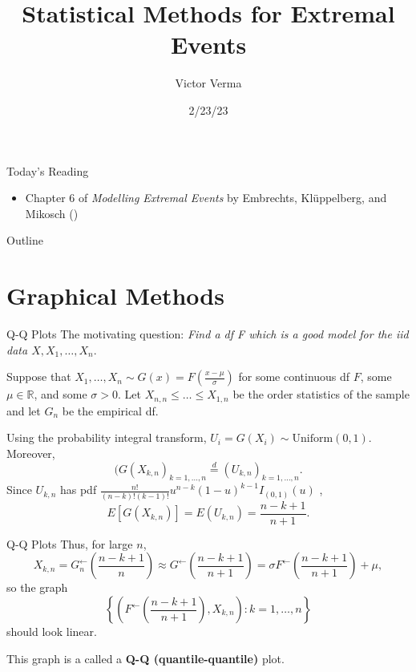 \documentclass{beamer}
\title[Statistical Methods for Extremal Events]{Statistical Methods for Extremal Events}
\author{Victor Verma}
\institute[]
{
Prof. Yang Chen's Reading Group \\
Department of Statistics \\
University of Michigan
}
\date[2/23/23]{2/23/23}
\begin{document}
\begin{frame}
    \titlepage
\end{frame}

\begin{frame}{Today's Reading}
    \begin{itemize}
        \item Chapter 6 of \textit{Modelling Extremal Events} by Embrechts, Kl\"{u}ppelberg, and Mikosch (\cite{embrechts_et_al_1997})
    \end{itemize}
\end{frame}

\begin{frame}{Outline}
    \tableofcontents
\end{frame}

\section{Graphical Methods}

\begin{frame}{Q-Q Plots}
    The motivating question: \textit{Find a df F which is a good model for the iid data $X, X_1, \ldots, X_n$}.

    \medskip

    Suppose that $X_1, \ldots, X_n \sim G(x) = F\left(\frac{x - \mu}{\sigma}\right)$ for some continuous df $F$, some $\mu \in \mathbb{R}$, and some $\sigma > 0$. Let $X_{n, n} \le \ldots \le X_{1, n}$ be the order statistics of the sample and let $G_n$ be the empirical df.

    \medskip

    Using the probability integral transform, $U_i = G(X_i) \sim \text{Uniform}(0, 1)$. Moreover,
    \[
    (G(X_{k, n})_{k = 1, \ldots, n} \overset{d}{=} (U_{k, n})_{k = 1, \ldots, n}.
    \]
    Since $U_{k, n}$ has pdf $\frac{n!}{(n - k)!(k - 1)!}u^{n - k}(1 - u)^{k - 1}I_{(0, 1)}(u)$ \cite{casella_and_berger_2002},
    \[
    E[G(X_{k, n})] = E(U_{k, n}) = \frac{n - k + 1}{n + 1}.
    \]
\end{frame}

\begin{frame}{Q-Q Plots}
    Thus, for large $n$,
    \[
    X_{k, n} = G_n^{\leftarrow}\left(\frac{n - k + 1}{n}\right) \approx G^{\leftarrow}\left(\frac{n - k + 1}{n + 1}\right) = \sigma F^{\leftarrow}\left(\frac{n - k + 1}{n + 1}\right) + \mu,
    \]
    so the graph
    \[
    \left\{\left(F^{\leftarrow}\left(\frac{n - k + 1}{n + 1}\right), X_{k, n}\right) : k = 1, \ldots, n\right\}
    \]
    should look linear.

    \smallskip

    This graph is a called a \textbf{Q-Q (quantile-quantile)} plot.
\end{frame}
\end{document}
